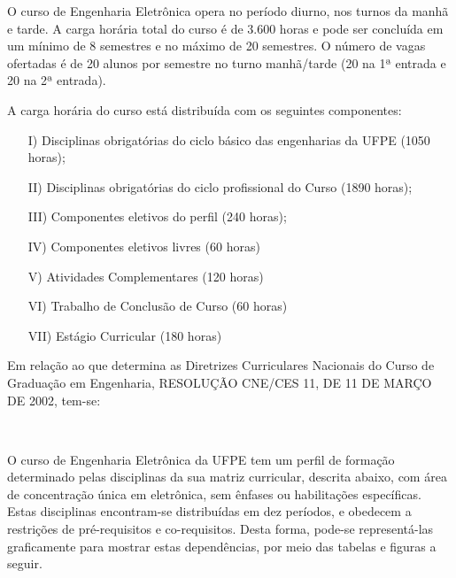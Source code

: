 O curso de Engenharia Eletrônica opera no período diurno, nos turnos da manhã e tarde. A carga horária total do curso é de 3.600 horas e pode ser concluída em um mínimo de 8 semestres e no máximo de 20 semestres. O número de vagas ofertadas é de 20 alunos por semestre no turno manhã/tarde (20 na 1ª entrada e 20 na 2ª entrada).

A carga horária do curso está distribuída com os seguintes componentes:
\begin{enumerate}
\item[I)] Disciplinas obrigatórias do ciclo básico das engenharias da UFPE (1050 horas);
\item[II)] Disciplinas obrigatórias do ciclo profissional do Curso (1890 horas);
\item[III)] Componentes eletivos do perfil (240 horas);
\item[IV)] Componentes eletivos livres (60 horas)
\item[V)] Atividades Complementares (120 horas)
\item[VI)] Trabalho de Conclusão de Curso (60 horas)
\item[VII)] Estágio Curricular (180 horas)
\end{enumerate}

Em relação ao que determina as Diretrizes Curriculares Nacionais do Curso de Graduação em Engenharia, RESOLUÇÃO CNE/CES 11, DE 11 DE MARÇO DE 2002, tem-se:

\begin{table}[h!]
	\caption{Distribuição da carga horária}
	\centering
	\\
	\label{tab1}
\end{table}

O curso de Engenharia Eletrônica da UFPE tem um perfil de formação determinado pelas disciplinas da sua matriz curricular, descrita abaixo, com área de concentração única em eletrônica, sem ênfases ou habilitações específicas. Estas disciplinas encontram-se distribuídas em dez períodos, e obedecem a restrições de pré-requisitos e co-requisitos. Desta forma, pode-se representá-las graficamente para mostrar estas dependências, por meio das tabelas e figuras a seguir.

